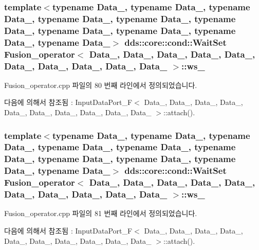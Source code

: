\subsubsection[{\texorpdfstring{ws\+\_\+5}{ws_5}}]{\setlength{\rightskip}{0pt plus 5cm}template$<$typename Data\+\_, typename Data\+\_, typename Data\+\_, typename Data\+\_, typename Data\+\_, typename Data\+\_, typename Data\+\_, typename Data\+\_, typename Data\+\_, typename Data\+\_$>$ dds\+::core\+::cond\+::\+Wait\+Set {\bf Fusion\+\_\+operator}$<$ Data\+\_, Data\+\_, Data\+\_, Data\+\_, Data\+\_, Data\+\_, Data\+\_, Data\+\_, Data\+\_, Data\+\_ $>$\+::ws\+\_}\hypertarget{classFusion__operator_ac2bc73cfd2d097373d0716e61c843a33}{}\label{classFusion__operator_ac2bc73cfd2d097373d0716e61c843a33}


Fusion\+\_\+operator.\+cpp 파일의 80 번째 라인에서 정의되었습니다.



다음에 의해서 참조됨 \+:  Input\+Data\+Port\+\_\+\+F$<$ Data\+\_, Data\+\_, Data\+\_, Data\+\_, Data\+\_, Data\+\_, Data\+\_, Data\+\_, Data\+\_, Data\+\_ $>$\+::attach().

\subsubsection[{\texorpdfstring{ws\+\_\+6}{ws_6}}]{\setlength{\rightskip}{0pt plus 5cm}template$<$typename Data\+\_, typename Data\+\_, typename Data\+\_, typename Data\+\_, typename Data\+\_, typename Data\+\_, typename Data\+\_, typename Data\+\_, typename Data\+\_, typename Data\+\_$>$ dds\+::core\+::cond\+::\+Wait\+Set {\bf Fusion\+\_\+operator}$<$ Data\+\_, Data\+\_, Data\+\_, Data\+\_, Data\+\_, Data\+\_, Data\+\_, Data\+\_, Data\+\_, Data\+\_ $>$\+::ws\+\_}\hypertarget{classFusion__operator_a32e2694d512a9ba74b13a0b07f8f4649}{}\label{classFusion__operator_a32e2694d512a9ba74b13a0b07f8f4649}


Fusion\+\_\+operator.\+cpp 파일의 81 번째 라인에서 정의되었습니다.



다음에 의해서 참조됨 \+:  Input\+Data\+Port\+\_\+\+F$<$ Data\+\_, Data\+\_, Data\+\_, Data\+\_, Data\+\_, Data\+\_, Data\+\_, Data\+\_, Data\+\_, Data\+\_ $>$\+::attach().

